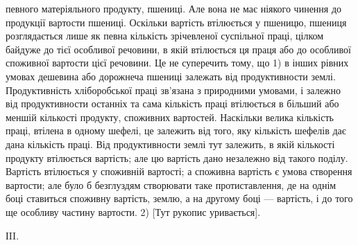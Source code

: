 \parcont{}  %
певного матеріяльного продукту, пшениці. Але вона не має ніякого чинення до продукції
вартости пшениці. Оскільки вартість втілюється у пшеницю, пшениця
розглядається лише як певна кількість зрічевленої суспільної праці, цілком
байдуже до тієї особливої речовини, в якій втілюється ця праця або до особливої
споживної вартости цієї речовини. Це не суперечить тому, що 1) в інших рівних
умовах дешевина або дорожнеча пшениці залежать від продуктивности землі. Продуктивність
хліборобської праці зв’язана з природними умовами, і залежно від продуктивности
останніх та сама кількість праці втілюється в більший або меншій кількості
продукту, споживних вартостей. Наскільки велика кількість праці, втілена в
одному шефелі, це залежить від того, яку кількість шефелів дає дана кількість праці.
Від продуктивности землі тут залежить, в якій кількості продукту втілюється вартість;
але цю вартість дано незалежно від такого поділу. Вартість втілюється
у споживній вартості; а споживна вартість є умова створення вартости; але
було б безглуздям створювати таке протиставлення, де на однім боці ставиться
споживну вартість, землю, а на другому боці — вартість, і до того ще особливу
частину вартости. 2) [Тут рукопис уривається].

ІII.

